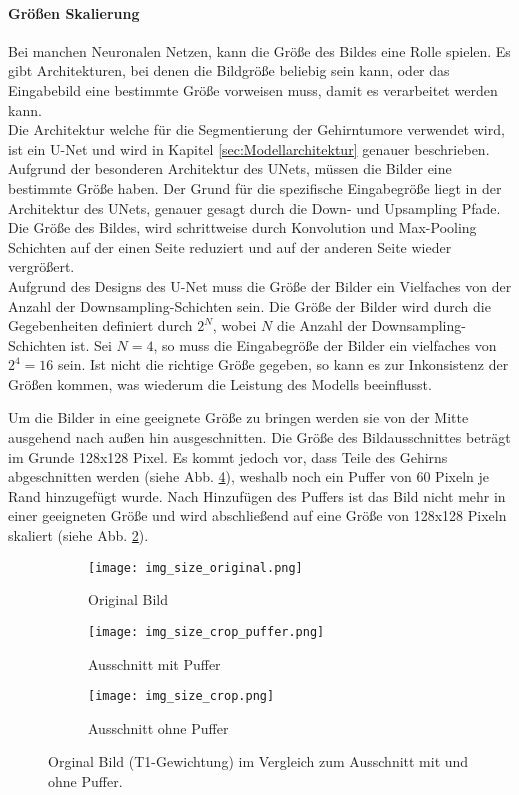 \paragraph{Größen Skalierung}
\label{paragraph:GrößenSkalierung}
Bei manchen Neuronalen Netzen, kann die Größe des Bildes eine Rolle spielen. Es gibt Architekturen, bei denen die Bildgröße beliebig sein kann, oder das Eingabebild eine bestimmte Größe vorweisen muss, damit es verarbeitet werden kann. \\
Die Architektur welche für die Segmentierung der Gehirntumore verwendet wird, ist ein U-Net und wird in Kapitel \ref{sec:Modellarchitektur} genauer beschrieben. Aufgrund der besonderen Architektur des UNets, müssen die Bilder eine bestimmte Größe haben. Der Grund für die spezifische Eingabegröße liegt in der Architektur des UNets, genauer gesagt durch die Down- und Upsampling Pfade. Die Größe des Bildes, wird schrittweise durch Konvolution und Max-Pooling Schichten auf der einen Seite reduziert und auf der anderen Seite wieder vergrößert. \\
Aufgrund des Designs des U-Net muss die Größe der Bilder ein Vielfaches von der Anzahl der Downsampling-Schichten sein. Die Größe der Bilder wird durch die Gegebenheiten definiert durch $2^N$, wobei $N$ die Anzahl der Downsampling-Schichten ist. Sei $N=4$, so muss die Eingabegröße der Bilder ein vielfaches von $2^4=16$ sein. Ist nicht die richtige Größe gegeben, so kann es zur Inkonsistenz der Größen kommen, was wiederum die Leistung des \gls{Modell}s beeinflusst. \cite[vgl.][]{Ronneberger2015}

Um die Bilder in eine geeignete Größe zu bringen werden sie von der Mitte ausgehend nach außen hin ausgeschnitten. Die Größe des Bildausschnittes beträgt im Grunde 128x128 Pixel. Es kommt jedoch vor, dass Teile des Gehirns abgeschnitten werden (siehe Abb. \ref{fig:GrößeOhnePuffer}), weshalb noch ein Puffer von 60 Pixeln je Rand hinzugefügt wurde. Nach Hinzufügen des Puffers ist das Bild nicht mehr in einer geeigneten Größe und wird abschließend auf eine Größe von 128x128 Pixeln skaliert (siehe Abb. \ref{fig:GrößePuffer}).
\begin{figure}[ht]
	\centering
	\begin{subfigure}[b]{0.4\textwidth}
		\centering
		\texttt{[image: img\_size\_original.png]}
		\caption{Original Bild}
		\label{fig:GrößeOrg}
	\end{subfigure}
\vfil
	\begin{subfigure}[b]{0.4\linewidth}
		\centering
		\texttt{[image: img\_size\_crop\_puffer.png]}
		\caption{Ausschnitt mit Puffer}
		\label{fig:GrößePuffer}
	\end{subfigure}
\hfil
	\begin{subfigure}[b]{0.4\linewidth}
		\centering
		\texttt{[image: img\_size\_crop.png]}
		\caption{Ausschnitt ohne Puffer}
		\label{fig:GrößeOhnePuffer}
	\end{subfigure}
	\caption{Orginal Bild (T1-Gewichtung) im Vergleich zum Ausschnitt mit und ohne Puffer.}
\end{figure} 


